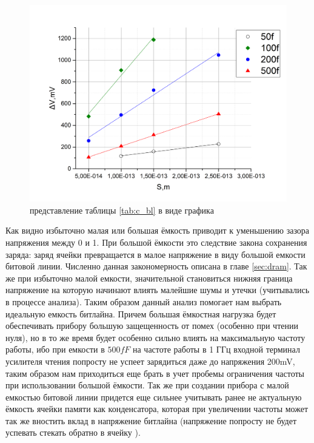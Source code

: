 \documentclass[a4paper,12pt]{article} %
\begin{document}
\begin{figure}
  \begin{center}
   \includegraphics[width=\linewidth]{c_bl.png}
  \end{center}
  \caption{представление таблицы \ref{tab:c_bl} в виде графика }
  \label{pic:c_bl}
\end{figure}





Как видно избыточно малая или большая ёмкость приводит к уменьшению зазора напряжения между 0 и 1. При большой ёмкости это следствие закона сохранения заряда: заряд ячейки превращается в малое напряжение в виду большой емкости битовой линии. Численно данная закономерность описана в главе \ref{sec:dram}. Так же при избыточно малой емкости, значительной становиться нижняя граница напряжение на которую начинают влиять малейшие шумы и утечки (учитывались в процессе анализа). Таким образом данный анализ помогает нам выбрать идеальную емкость битлайна. Причем большая ёмкостная нагрузка будет обеспечивать прибору большую защещенность от помех (особенно при чтении нуля), но в то же время будет особенно сильно влиять на максимальную частоту работы, ибо при емкости в $500fF$  на частоте работы в 1 ГГц входной терминал усилителя чтения попросту не успеет зарядиться даже до напряжения 200mV, таким образом нам приходиться еще брать в учет пробемы ограничения частоты при использовании большой ёмкости. Так же при создании прибора с малой емкостью битовой линии придется еще сильнее учитывать ранее не актуальную ёмкость ячейки памяти как конденсатора, которая при увеличении частоты может так же вностить вклад в напряжение битлайна (напряжение попросту не будет успевать стекать обратно в ячейку ).
\end{document}
